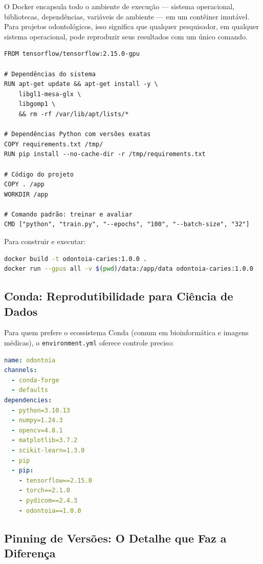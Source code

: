 O Docker encapsula todo o ambiente de execução — sistema operacional,
bibliotecas, dependências, variáveis de ambiente — em um contêiner
imutável. Para projetos odontológicos, isso significa que qualquer
pesquisador, em qualquer sistema operacional, pode reproduzir seus
resultados com um único comando.

\begin{lstlisting}[language=docker, caption=Dockerfile para ambiente odontológico reproduzível]
FROM tensorflow/tensorflow:2.15.0-gpu

# Dependências do sistema
RUN apt-get update && apt-get install -y \
    libgl1-mesa-glx \
    libgomp1 \
    && rm -rf /var/lib/apt/lists/*

# Dependências Python com versões exatas
COPY requirements.txt /tmp/
RUN pip install --no-cache-dir -r /tmp/requirements.txt

# Código do projeto
COPY . /app
WORKDIR /app

# Comando padrão: treinar e avaliar
CMD ["python", "train.py", "--epochs", "100", "--batch-size", "32"]
\end{lstlisting}

Para construir e executar:

\begin{lstlisting}[language=bash]
docker build -t odontoia-caries:1.0.0 .
docker run --gpus all -v $(pwd)/data:/app/data odontoia-caries:1.0.0
\end{lstlisting}

\subsection{Conda: Reprodutibilidade para Ciência de Dados}

Para quem prefere o ecossistema Conda (comum em bioinformática e
imagens médicas), o \texttt{environment.yml} oferece controle preciso:

\begin{lstlisting}[language=yaml, caption=environment.yml com versões exatas]
name: odontoia
channels:
  - conda-forge
  - defaults
dependencies:
  - python=3.10.13
  - numpy=1.24.3
  - opencv=4.8.1
  - matplotlib=3.7.2
  - scikit-learn=1.3.0
  - pip
  - pip:
    - tensorflow==2.15.0
    - torch==2.1.0
    - pydicom==2.4.3
    - odontoia==1.0.0
\end{lstlisting}

\subsection{Pinning de Versões: O Detalhe que Faz a Diferença}

